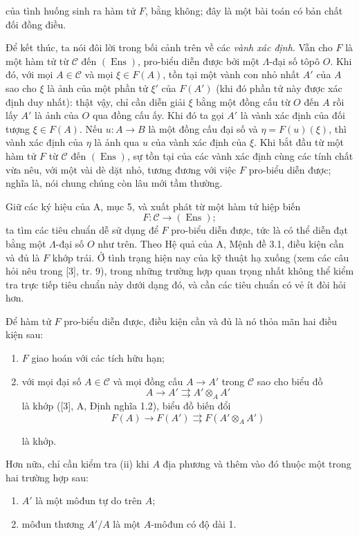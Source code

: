 của tình huống sinh ra hàm tử $F$, bằng không; đây là một bài toán có bản
chất đối đồng điều.

Để kết thúc, ta nói đôi lời trong bối cảnh trên về các \emph{vành xác định}.
Vẫn cho $F$ là một hàm tử từ $\mathcal C$ đến $(\operatorname{Ens})$,
pro-biểu diễn được bởi một $\Lambda$-đại số tôpô $O$. Khi đó, với mọi
$A\in\mathcal C$ và mọi $\xi\in F(A)$, tồn tại một vành con nhỏ nhất $A'$ của
$A$ sao cho $\xi$ là ảnh của một phần tử $\xi'$ của $F(A')$ (khi đó phần tử
này được xác định duy nhất): thật vậy, chỉ cần diễn giải $\xi$ bằng một đồng
cấu từ $O$ đến $A$ rồi lấy $A'$ là ảnh của $O$ qua đồng cấu ấy. Khi đó ta
gọi $A'$ là vành xác định của đối tượng $\xi\in F(A)$. Nếu
$u:A\longrightarrow B$ là một đồng cấu đại số và $\eta=F(u)(\xi)$, thì vành
xác định của $\eta$ là ảnh qua $u$ của vành xác định của $\xi$. Khi bắt đầu
từ một hàm tử $F$ từ $\mathcal C$ đến $(\operatorname{Ens})$, sự tồn tại của
các vành xác định cùng các tính chất vừa nêu, với một vài dè dặt nhỏ, tương
đương với việc $F$ pro-biểu diễn được; nghĩa là, nói chung chúng còn lâu mới
tầm thường.


Giữ các ký hiệu của A, mục 5, và xuất phát từ một hàm tử hiệp biến
\[
  F:\mathcal C\longrightarrow(\operatorname{Ens});
\]
ta tìm các tiêu chuẩn dễ sử dụng để $F$ pro-biểu diễn được, tức là có thể
diễn đạt bằng một $\Lambda$-đại số $O$ như trên. Theo Hệ quả của A, Mệnh đề
3.1, điều kiện cần và đủ là $F$ khớp trái. Ở tình trạng hiện nay của kỹ thuật
hạ xuống (xem các câu hỏi nêu trong [3], tr. 9), trong những trường hợp quan
trọng nhất không thể kiểm tra trực tiếp tiêu chuẩn này dưới dạng đó, và cần
các tiêu chuẩn có vẻ ít đòi hỏi hơn.

 Để hàm tử $F$ pro-biểu diễn được, điều kiện cần và đủ là
nó thỏa mãn hai điều kiện sau:
\begin{enumerate}
\item[(i)] $F$ giao hoán với các tích hữu hạn;
\item[(ii)] với mọi đại số $A\in\mathcal C$ và mọi đồng cấu
$A\longrightarrow A'$ trong $\mathcal C$ sao cho biểu đồ
\[
  A\longrightarrow A'\rightrightarrows A'\otimes_A A'
\]
là khớp ([3], A, Định nghĩa 1.2), biểu đồ biến đổi
\[
  F(A)\longrightarrow F(A')\rightrightarrows F(A'\otimes_A A')
\]

là khớp.
\end{enumerate}
Hơn nữa, chỉ cần kiểm tra (ii) khi $A$ địa phương và thêm vào đó thuộc một
trong hai trường hợp sau:
\begin{enumerate}
\item[(a)] $A'$ là một môđun tự do trên $A$;
\item[(b)] môđun thương $A'/A$ là một $A$-môđun có độ dài 1.
\end{enumerate}

